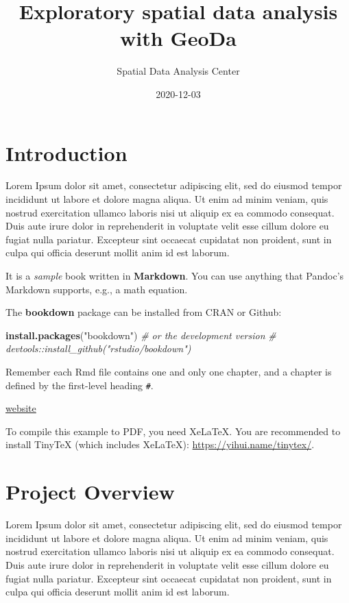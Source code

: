 \documentclass[
]{book}
\title{Exploratory spatial data analysis with GeoDa}
\author{Spatial Data Analysis Center}
\date{2020-12-03}
\newenvironment{Shaded}{\begin{snugshade}}{\end{snugshade}}
\newcommand{\CommentTok}[1]{\textcolor[rgb]{0.56,0.35,0.01}{\textit{#1}}}
\newcommand{\KeywordTok}[1]{\textcolor[rgb]{0.13,0.29,0.53}{\textbf{#1}}}
\newcommand{\NormalTok}[1]{#1}
\newcommand{\StringTok}[1]{\textcolor[rgb]{0.31,0.60,0.02}{#1}}
\begin{document}
\maketitle

{
\setcounter{tocdepth}{1}
\tableofcontents
}
\hypertarget{introduction}{%
\chapter*{Introduction}\label{introduction}}

Lorem Ipsum dolor sit amet, consectetur adipiscing elit, sed do eiusmod tempor incididunt ut labore et dolore magna aliqua. Ut enim ad minim veniam, quis nostrud exercitation ullamco laboris nisi ut aliquip ex ea commodo consequat. Duis aute irure dolor in reprehenderit in voluptate velit esse cillum dolore eu fugiat nulla pariatur. Excepteur sint occaecat cupidatat non proident, sunt in culpa qui officia deserunt mollit anim id est laborum.

It is a \emph{sample} book written in \textbf{Markdown}. You can use anything that Pandoc's Markdown supports, e.g., a math equation.

The \textbf{bookdown} package can be installed from CRAN or Github:

\begin{Shaded}
\begin{Highlighting}[]
\KeywordTok{install.packages}\NormalTok{(}\StringTok{"bookdown"}\NormalTok{)}
\CommentTok{# or the development version}
\CommentTok{# devtools::install_github("rstudio/bookdown")}
\end{Highlighting}
\end{Shaded}

Remember each Rmd file contains one and only one chapter, and a chapter is defined by the first-level heading \texttt{\#}.

\href{https://yihui.name/tinytex/}{website}

To compile this example to PDF, you need XeLaTeX. You are recommended to install TinyTeX (which includes XeLaTeX): \url{https://yihui.name/tinytex/}.

\hypertarget{intro}{%
\chapter{Project Overview}\label{intro}}

Lorem Ipsum dolor sit amet, consectetur adipiscing elit, sed do eiusmod tempor incididunt ut labore et dolore magna aliqua. Ut enim ad minim veniam, quis nostrud exercitation ullamco laboris nisi ut aliquip ex ea commodo consequat. Duis aute irure dolor in reprehenderit in voluptate velit esse cillum dolore eu fugiat nulla pariatur. Excepteur sint occaecat cupidatat non proident, sunt in culpa qui officia deserunt mollit anim id est laborum.
\end{document}
